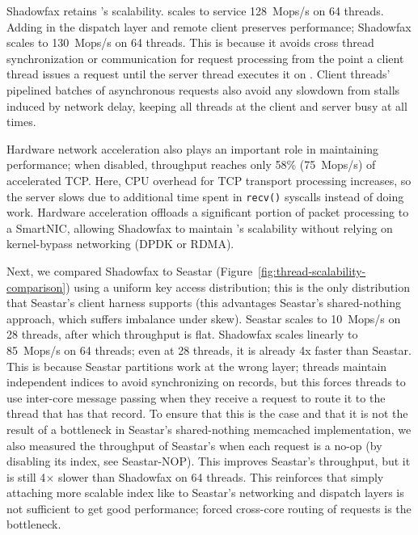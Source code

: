 %
Shadowfax retains \faster{}'s scalability.
%
\faster{} scales to service 128~Mops/s on 64 threads.
%
Adding in the dispatch layer and remote client preserves performance;
Shadowfax scales to 130~Mops/s on 64 threads.
%
This is because it avoids cross thread synchronization or communication for
request processing from the point a client thread issues a request until the
server thread executes it on \faster.
%
Client threads' pipelined batches of asynchronous requests also avoid any
slowdown from stalls induced by network delay, keeping all threads at the
client and server busy at all times.

Hardware network acceleration also plays an important role in
maintaining performance; when disabled, throughput reaches only 58\%
(75~Mops/s) of
accelerated TCP.
%
Here, CPU overhead for TCP transport processing increases, so the server
slows due to additional time spent in \texttt{recv()} syscalls instead of doing
work.
%
Hardware acceleration offloads a significant portion of packet processing to a
SmartNIC, allowing Shadowfax to maintain \faster{}'s scalability without
relying on kernel-bypass networking (DPDK or RDMA).

Next, we compared Shadowfax to Seastar
(Figure~\ref{fig:thread-scalability-comparison}) using a uniform key access
distribution; this is the only distribution that Seastar's client harness
supports (this advantages Seastar's shared-nothing approach, which suffers
imbalance under skew).
%
Seastar scales to 10~Mops/s on 28 threads, after which throughput is flat.
%
Shadowfax scales linearly to 85~Mops/s on 64 threads; even at 28 threads, it is
already 4x faster than Seastar.
%
This is because Seastar partitions work at the wrong layer; threads maintain
independent indices to avoid synchronizing on records, but this forces threads
to use inter-core message passing when they receive a request to route it to
the thread that has that record.
%
To ensure that this is the case and that it is not the result of a bottleneck in
Seastar's shared-nothing memcached implementation, we also measured the
throughput of Seastar's when each request is a no-op (by disabling its index,
see Seastar-NOP).
%
This improves Seastar's throughput, but it is still 4$\times{}$ slower
than Shadowfax on 64 threads.
%
This reinforces that simply attaching more scalable index like
\faster to Seastar's networking and dispatch layers is not sufficient to get
good performance; forced cross-core routing of requests is the bottleneck.


